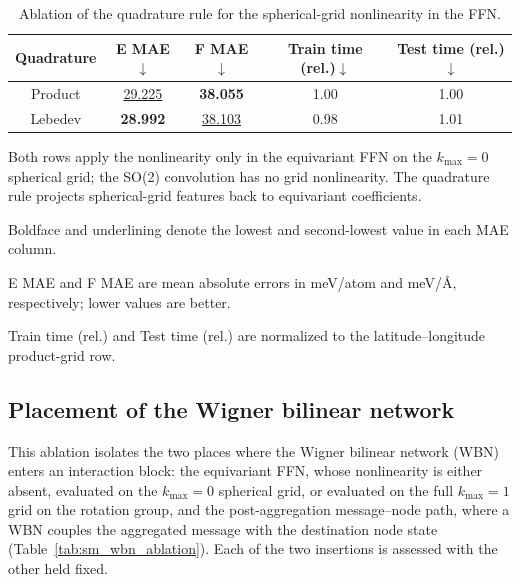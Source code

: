 \begin{table}[ht]
    \PaperTableStyle
    \begin{threeparttable}
        \caption{Ablation of the quadrature rule for the spherical-grid nonlinearity in the FFN.}
        \label{tab:sm_quadrature_ablation}
        \begin{tabular*}{\linewidth}{@{\extracolsep{\fill}}ccccc@{}}
            \toprule
            \textbf{Quadrature}                    &
            \textbf{E MAE}$\downarrow$\tnote{a}    &
            \textbf{F MAE}$\downarrow$\tnote{a}    &
            \textbf{Train time (rel.)}$\downarrow$\tnote{b} &
            \textbf{Test time (rel.)}$\downarrow$\tnote{b}                                                              \\
            \midrule
            Product & \underline{29.225} & \textbf{38.055}    & 1.00 & 1.00 \\
            Lebedev & \textbf{28.992}    & \underline{38.103} & 0.98 & 1.01 \\
            \bottomrule
        \end{tabular*}
        \begin{tablenotes}[flushleft]
            \PaperTableNotesStyle
            \item[] Both rows apply the nonlinearity only in the equivariant FFN on the $k_{\max}=0$ spherical grid; the SO(2) convolution has no grid nonlinearity. The quadrature rule projects spherical-grid features back to equivariant coefficients.
            \item[] Boldface and underlining denote the lowest and second-lowest value in each MAE column.
            \item[a] E MAE and F MAE are mean absolute errors in meV/atom and meV/\AA, respectively; lower values are better.
            \item[b] Train time (rel.) and Test time (rel.) are normalized to the latitude--longitude product-grid row.
        \end{tablenotes}
    \end{threeparttable}
\end{table}

\FloatBarrier

\subsection{Placement of the Wigner bilinear network}

This ablation isolates the two places where the Wigner bilinear network (WBN) enters an interaction block: the equivariant FFN, whose nonlinearity is either absent, evaluated on the $k_{\max}=0$ spherical grid, or evaluated on the full $k_{\max}=1$ grid on the rotation group, and the post-aggregation message--node path, where a WBN couples the aggregated message with the destination node state (Table~\ref{tab:sm_wbn_ablation}).
Each of the two insertions is assessed with the other held fixed.

